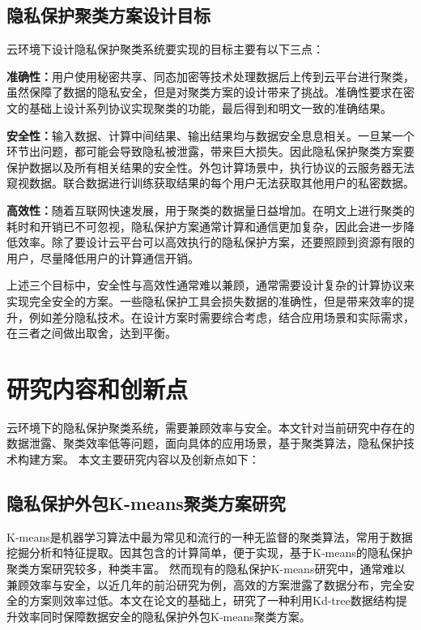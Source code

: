 \subsection{隐私保护聚类方案设计目标}
云环境下设计隐私保护聚类系统要实现的目标主要有以下三点：
\begin{compactitem}
	\item \textbf{准确性：}用户使用秘密共享、同态加密等技术处理数据后上传到云平台进行聚类，虽然保障了数据的隐私安全，但是对聚类方案的设计带来了挑战。准确性要求在密文的基础上设计系列协议实现聚类的功能，最后得到和明文一致的准确结果。
	\item \textbf{安全性：}输入数据、计算中间结果、输出结果均与数据安全息息相关。一旦某一个环节出问题，都可能会导致隐私被泄露，带来巨大损失。因此隐私保护聚类方案要保护数据以及所有相关结果的安全性。外包计算场景中，执行协议的云服务器无法窥视数据。联合数据进行训练获取结果的每个用户无法获取其他用户的私密数据。
	\item \textbf{高效性：}随着互联网快速发展，用于聚类的数据量日益增加。在明文上进行聚类的耗时和开销已不可忽视，隐私保护方案通常计算和通信更加复杂，因此会进一步降低效率。除了要设计云平台可以高效执行的隐私保护方案，还要照顾到资源有限的用户，尽量降低用户的计算通信开销。
\end{compactitem}

上述三个目标中，安全性与高效性通常难以兼顾，通常需要设计复杂的计算协议来实现完全安全的方案。一些隐私保护工具会损失数据的准确性，但是带来效率的提升，例如差分隐私技术。在设计方案时需要综合考虑，结合应用场景和实际需求，在三者之间做出取舍，达到平衡。
\section{研究内容和创新点}
云环境下的隐私保护聚类系统，需要兼顾效率与安全。本文针对当前研究中存在的数据泄露、聚类效率低等问题，面向具体的应用场景，基于聚类算法，隐私保护技术构建方案。
本文主要研究内容以及创新点如下：
\subsection{隐私保护外包K-means聚类方案研究}
K-means是机器学习算法中最为常见和流行的一种无监督的聚类算法，常用于数据挖掘分析和特征提取。因其包含的计算简单，便于实现，基于K-means的隐私保护聚类方案研究较多，种类丰富。
然而现有的隐私保护K-means研究中，通常难以兼顾效率与安全，以近几年的前沿研究为例，高效的方案泄露了数据分布\cite{wu2020secure}，完全安全的方案则效率过低\cite{jaschke2019unsupervised}。本文在论文\cite{kanungo2002efficient}的基础上，研究了一种利用Kd-tree数据结构提升效率同时保障数据安全的隐私保护外包K-means聚类方案。

